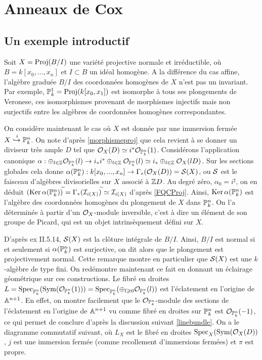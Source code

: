 \chapter{Anneaux de Cox}

\section{Un exemple introductif}

Soit $X=\operatorname{Proj}(B/I)$ une variété projective normale et irréductible, où $B=k[x_0,...,x_n]$ et $I\subset B$ un idéal homogène. A la différence du cas affine, l'algèbre graduée $B/I$ des coordonnées homogènes de $X$ n'est pas un invariant. Par exemple, $\mathbb{P}^1_k=\operatorname{Proj}(k[x_0,x_1])$ est isomorphe à tous ses plongements de Veronese, ces isomorphismes provenant de morphismes injectifs mais non surjectifs entre les algèbres de coordonnées homogènes correspondantes.

On considère maintenant le cas où $X$ est donnée par une immersion fermée $X\xhookrightarrow{i}\mathbb{P}^n_k $. On note d'après \ref{morphismeproj} que cela revient à se donner un diviseur très ample $D$ tel que $\mathcal{O}_X(D)\simeq i^*\mathcal{O}_{\mathbb{P}^n_k}(1)$. Considérons l'application canonique $\alpha: \oplus_{l\in\mathbb{Z}}\mathcal{O}_{\mathbb{P}^n_k}(l)\rightarrow i_*i^*\oplus_{l\in \mathbb{Z}}\mathcal{O}_{\mathbb{P}^n_k}(l)\simeq i_*\oplus_{l\in \mathbb{Z}}\mathcal{O}_X(lD)$. Sur les sections globales cela donne $\alpha(\mathbb{P}^n_k): k[x_0,...,x_n]\rightarrow \Gamma_*(\mathcal{O}_X(D))=\mathcal{S}(X)$, ou $\mathcal{S}$ est le faisceau d'algèbres divisorielles sur $X$ associé à $\mathbb{Z} D$. Au degré zéro, $\alpha_0=i^\sharp$, on en déduit $(\operatorname{Ker} \alpha(\mathbb{P}^n_k))^{\widetilde{}}=\Gamma_*(\mathcal{I} _{i(X)})^{\widetilde{}}\simeq \mathcal{I} _{i(X)}$ d'après \ref{FQCProj}. Ainsi, $\operatorname{Ker} \alpha(\mathbb{P}^n_k)$ est l'algèbre des coordonnées homogènes du plongement de $X$ dans $\mathbb{P}_k^n$. On l'a déterminée à partir d'un $\mathcal{O}_X$-module inversible, c'est à dire un élément de son groupe de Picard, qui est un objet intrinsèquement défini sur $X$.

D'après \cite{Hartshorne} ex II.5.14, $\mathcal{S}(X)$ est la clôture intégrale de $B/I$. Ainsi, $B/I$ est normal si et seulement si $\alpha(\mathbb{P}^n_k)$ est surjective, on dit alors que le plongement est projectivement normal. Cette remarque montre en particulier que $\mathcal{S}(X)$ est une $k$-algèbre de type fini. On redémontre maintenant ce fait en donnant un éclairage géométrique sur ces constructions. Le fibré en droites $L=\operatorname{Spec}_{\mathbb{P}^n_k}(\operatorname{Sym}(\mathcal{O}_{\mathbb{P}^n_k}(1))) = \operatorname{Spec}_{\mathbb{P}^n_k}(\oplus_{l\geqslant 0}\mathcal{O}_{\mathbb{P}^n_k}(l))$ est l'éclatement en l'origine de $\mathbb{A}^{n+1}$. En effet, on montre facilement que le $\mathcal{O}_{\mathbb{P}^n_k}$-module des sections de l'éclatement en l'origine de $\mathbb{A}^{n+1}$ vu comme fibré en droites sur $\mathbb{P}_k^n$ est $ \mathcal{O}_{\mathbb{P}^n_k}(-1)$, ce qui permet de conclure d'après la discussion suivant \ref{linebundle}. On a le diagramme commutatif suivant, où $L_X$ est le fibré en droites $\operatorname{Spec}_X(\operatorname{Sym}(\mathcal{O}_X(D))$, $j$ est une immersion fermée (comme recollement d'immersions fermées) et $\pi$ est propre.

